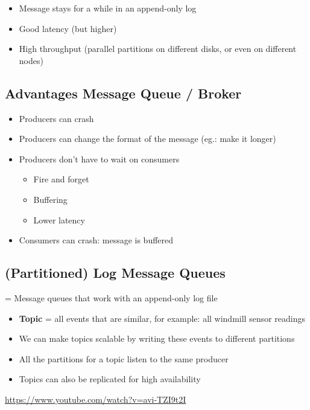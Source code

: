 \documentclass{article}
\begin{document}
\begin{itemize}
    \item Message stays for a while in an append-only log
    \item Good latency (but higher)
    \item High throughput (parallel partitions on different disks, or even on different nodes) 
\end{itemize}

\subsection{Advantages Message Queue / Broker}

\begin{itemize}
    \item Producers can crash
    \item Producers can change the format of the message (eg.: make it longer)
    \item Producers don't have to wait on consumers
    \begin{itemize}
        \item Fire and forget
        \item Buffering
        \item Lower latency
    \end{itemize}
    \item Consumers can crash: message is buffered
\end{itemize}

\subsection{(Partitioned) Log Message Queues}

= Message queues that work with an append-only log file

\begin{itemize}
    \item \textbf{Topic} = all events that are similar, for example: all windmill sensor readings
    \item We can make topics scalable by writing these events to different partitions
    \item All the partitions for a topic listen to the same producer
    \item Topics can also be replicated for high availability
\end{itemize}

\url{https://www.youtube.com/watch?v=avi-TZI9t2I}
\end{document}
